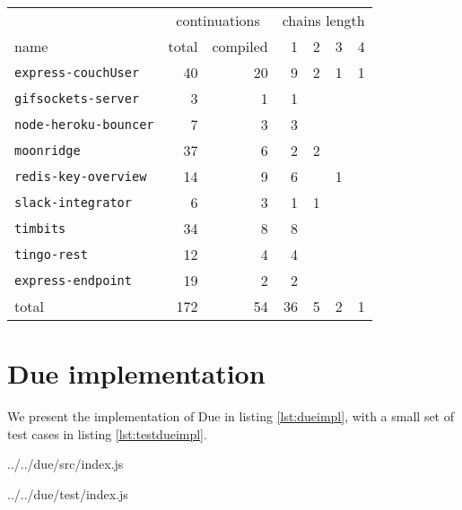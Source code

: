\begin{tabular}{l r r r r r r }
                                      & \multicolumn{2}{c}{continuations}      & \multicolumn{4}{c}{chains length}\\
name                                  & total              & compiled          & 1  & 2 & 3 & 4 \\
\hline
\texttt{express-couchUser}            & 40                 & 20                & 9  & 2 & 1 & 1 \\
\texttt{gifsockets-server}            & 3                  & 1                 & 1  &           \\ 
\texttt{node-heroku-bouncer}          & 7                  & 3                 & 3  &           \\
\texttt{moonridge}                    & 37                 & 6                 & 2  & 2         \\
\texttt{redis-key-overview}           & 14                 & 9                 & 6  &   & 1     \\
\texttt{slack-integrator}             & 6                  & 3                 & 1  & 1         \\
\texttt{timbits}                      & 34                 & 8                 & 8              \\
\texttt{tingo-rest}                   & 12                 & 4                 & 4              \\
\texttt{express-endpoint}             & 19                 & 2                 & 2              \\
\hline
total                                 & 172                & 54                & 36 & 5 & 2 & 1 \\
\end{tabular}




\section{Due implementation} \label{section:dueimpl}

We present the implementation of Due in listing \ref{lst:dueimpl}, with a small set of test cases in listing \ref{lst:testdueimpl}.

             {../../due/src/index.js}


             {../../due/test/index.js}